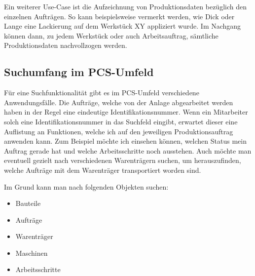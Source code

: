 Ein weiterer Use-Case ist die Aufzeichnung von Produktionsdaten bezüglich den einzelnen Aufträgen. So kann beispielsweise vermerkt werden, wie Dick oder Lange eine Lackierung auf dem Werkstück XY appliziert wurde. Im Nachgang können dann, zu jedem Werkstück oder auch Arbeitsauftrag, sämtliche Produktionsdaten nachvollzogen werden.

\subsection{Suchumfang im PCS-Umfeld\label{subsec3.2.1:Unterunterpunkt-1}}
Für eine Suchfunktionalität gibt es im PCS-Umfeld verschiedene Anwendungsfälle. Die Aufträge, welche von der Anlage abgearbeitet werden haben in der Regel eine eindeutige Identifikationsnummer. Wenn ein Mitarbeiter solch eine Identifikationsnummer in das Suchfeld eingibt, erwartet dieser eine Auflistung an Funktionen, welche ich auf den jeweiligen Produktionsauftrag anwenden kann. Zum Beispiel möchte ich einsehen können, welchen Status mein Auftrag gerade hat und welche Arbeitsschritte noch ausstehen. Auch möchte man eventuell gezielt nach verschiedenen Warenträgern suchen, um herauszufinden, welche Aufträge mit dem Warenträger transportiert worden sind.

Im Grund kann man nach folgenden Objekten suchen:

\begin{itemize}
    \item Bauteile
    \item Aufträge
    \item Warenträger
    \item Maschinen
    \item Arbeitsschritte
\end{itemize}